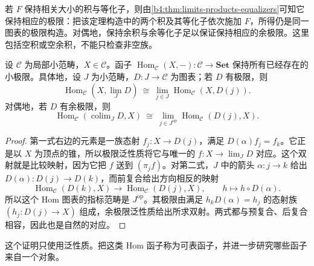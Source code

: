 若 \(F\) 保持相关大小的积与等化子，则由\cref{b4:thm:limits-products-equalizers}可知它保持相应的极限：把该定理构造中的两个积及其等化子依次施加 \(F\)，所得仍是同一图表的极限构造。对偶地，保持余积与余等化子足以保证保持相应的余极限。这里包括空积或空余积，不能只检查非空族。

\begin{proposition}\label{b4:prop:representables-preserve-limits}
	设 \(\mathcal C\) 为局部小范畴，\(X\in\mathcal C\)。函子 \(\operatorname{Hom}_{\mathcal C}(X,-):\mathcal C\rightarrow\mathbf{Set}\) 保持所有已经存在的小极限。具体地，设 \(J\) 为小范畴，\(D:J\rightarrow\mathcal C\) 为图表；若 \(D\) 有极限，则
	\[
		\operatorname{Hom}_{\mathcal C}(X,\lim_JD) \ \cong\
		\lim_{j\in J}\operatorname{Hom}_{\mathcal C}(X,D(j)).
	\]
	对偶地，若 \(D\) 有余极限，则
	\[
		\operatorname{Hom}_{\mathcal C}(\operatorname{colim}_JD,X) \ \cong\
		\lim_{j\in J^{\mathrm{op}}}\operatorname{Hom}_{\mathcal C}(D(j),X).
	\]
\end{proposition}
\begin{proof}
	第一式右边的元素是一族态射 \(f_j:X\rightarrow D(j)\)，满足 \(D(\alpha)f_j=f_k\)。它正是以 \(X\) 为顶点的锥，所以极限泛性质将它与唯一的 \(f:X\rightarrow\lim_JD\) 对应。这个双射就是比较映射，因为它把 \(f\) 送到 \((\pi_jf)\)。对第二式，\(J\) 中的箭头 \(\alpha:j\rightarrow k\) 给出 \(D(\alpha):D(j)\rightarrow D(k)\)，而前复合给出方向相反的映射
	\[
		\operatorname{Hom}_{\mathcal C}(D(k),X) \longrightarrow\operatorname{Hom}_{\mathcal C}(D(j),X), \qquad h\longmapsto h\circ D(\alpha).
	\]
	所以这个 Hom 图表的指标范畴是 \(J^{\mathrm{op}}\)。其极限由满足 \(h_kD(\alpha)=h_j\) 的态射族 \((h_j:D(j)\rightarrow X)\) 组成，余极限泛性质给出所求双射。两式都与预复合、后复合相容，因此也是自然的对应。
\end{proof}

这个证明只使用泛性质。把这类 Hom 函子称为可表函子，并进一步研究哪些函子来自一个对象。

